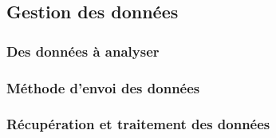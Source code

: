 \subsection{Gestion des données}
\label{Donnees}

\subsubsection{Des données à analyser}

\subsubsection{Méthode d'envoi des données}

\subsubsection{Récupération et traitement des données}